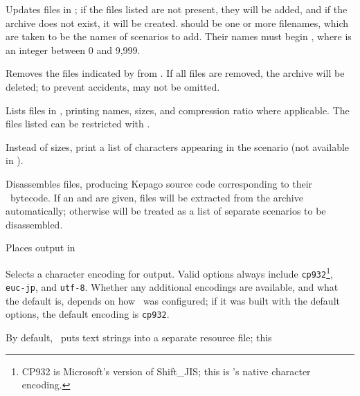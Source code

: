   \begin{nicelist}
  \item[\clboth{a}{add}]
    Updates files in ; if the files listed are not present,
    they will be added, and if the archive does not exist, it will be created.
     should be one or more filenames, which are taken to be the
    names of scenarios to add.  Their names must begin ,
    where  is an integer between 0 and 9,999.
  \item[\clboth{k}{delete}]
    Removes the files indicated by  from .  If
    all files are removed, the archive will be deleted; to prevent accidents,
     may not be omitted.
  \item[\clboth{l}{list}]
    Lists files in , printing names, sizes, and compression
    ratio where applicable.  The files listed can be restricted with
    .
    \begin{extraopts}
    \item[\clboth{N}{names}]
      Instead of sizes, print a list of characters appearing in the scenario
      (not available in \avgns).
    \end{extraopts}
  \item[\clboth{d}{disassemble}]
    Disassembles files, producing Kepago source code corresponding to their
    \reallive\ bytecode.  If an  and  are
    given, files will be extracted from the archive automatically; otherwise
     will be treated as a list of separate scenarios to be
    disassembled.
    \begin{extraopts}
    \item[\clbarg{o}{outdir}{DIR}]
      Places output in 
    \item[\clbarg{e}{encoding}{ENC}]\label{opt:enc}
      Selects a character encoding for output.  Valid options always include
      \texttt{cp932}\footnote{CP932 is Microsoft's version of Shift\_JIS; this
      is \reallive{}'s native character encoding.}, \texttt{euc-jp}, and
      \texttt{utf-8}.  Whether any additional encodings are available, and what
      the default is, depends on how \package\ was configured; if it was built
      with the default options, the default encoding is \texttt{cp932}.
    \item[\clboth{s}{single-file}]
      By default, \archiver\ puts text strings into a separate resource file; this

\end{extraopts}
\end{nicelist}
